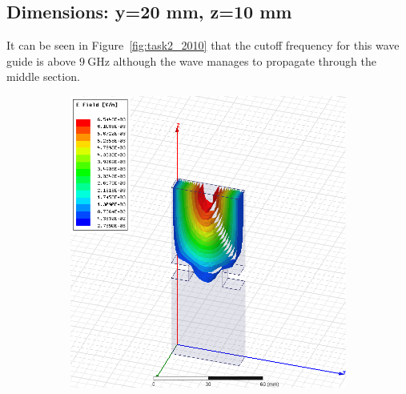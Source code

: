 \documentclass[12pt,a4paper]{article}
\begin{document}
\subsection{Dimensions: y=20 mm, z=10 mm}
It can be seen in Figure~\ref{fig:task2_2010} that the cutoff frequency for this wave guide is above $\SI{9}{\giga\hertz}$ although the wave manages to propagate through the middle section.
\begin{figure}
  \centering
  \begin{subfigure}[b]{0.49\textwidth}
    \includegraphics[width=\textwidth]{./mid_sec_20mm_wide_10mm_long/4ghz.png}
    \label{fig:2_2010_4ghz}
  \end{subfigure}
  \begin{subfigure}[b]{0.49\textwidth}

\end{subfigure}
\end{figure}
\end{document}
